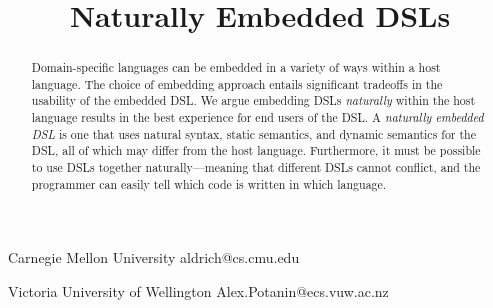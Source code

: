 \documentclass[preprint]{sigplanconf}
\begin{document}
\setlength{\pdfpageheight}{\paperheight}
\setlength{\pdfpagewidth}{\paperwidth}




\title{Naturally Embedded DSLs}

           {Carnegie Mellon University}
           {aldrich@cs.cmu.edu}

		   
		   
           {Victoria University of Wellington}
           {Alex.Potanin@ecs.vuw.ac.nz}
		   
\maketitle

\begin{abstract}
Domain-specific languages can be embedded in a variety of ways within a
host language.  The choice of embedding approach entails significant
tradeoffs in the usability of the embedded DSL.  We argue embedding DSLs
\textit{naturally} within the host language results in the best
experience for end users of the DSL.  A \textit{naturally embedded DSL}
is one that uses natural syntax, static semantics, and dynamic semantics
for the DSL, all of which may differ from the host language.
Furthermore, it must be possible to use DSLs together
naturally---meaning that different DSLs cannot conflict, and the
programmer can easily tell which code is written in which language.
\end{abstract}


%
\end{document}
